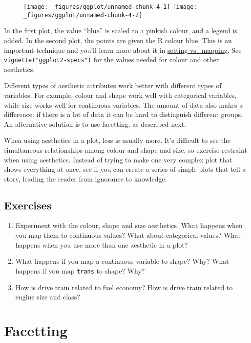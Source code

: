 \begin{figure}[H]
  \texttt{[image: \_figures/ggplot/unnamed-chunk-4-1]}%
  \texttt{[image: \_figures/ggplot/unnamed-chunk-4-2]}
\end{figure}

In the first plot, the value ``blue'' is scaled to a pinkish colour, and
a legend is added. In the second plot, the points are given the R colour
blue. This is an important technique and you'll learn more about it in
\protect\hyperlink{sub:setting-mapping}{setting vs.~mapping}. See
\texttt{vignette("ggplot2-specs")} for the values needed for colour and
other aesthetics.

Different types of aesthetic attributes work better with different types
of variables. For example, colour and shape work well with categorical
variables, while size works well for continuous variables. The amount of
data also makes a difference: if there is a lot of data it can be hard
to distinguish different groups. An alternative solution is to use
facetting, as described next.

When using aesthetics in a plot, less is usually more. It's difficult to
see the simultaneous relationships among colour and shape and size, so
exercise restraint when using aesthetics. Instead of trying to make one
very complex plot that shows everything at once, see if you can create a
series of simple plots that tell a story, leading the reader from
ignorance to knowledge.

\subsection{Exercises}\label{exercises-2}

\begin{enumerate}
\def\labelenumi{\arabic{enumi}.}
\item
  Experiment with the colour, shape and size aesthetics. What happens
  when you map them to continuous values? What about categorical values?
  What happens when you use more than one aesthetic in a plot?
\item
  What happens if you map a continuous variable to shape? Why? What
  happens if you map \texttt{trans} to shape? Why?
\item
  How is drive train related to fuel economy? How is drive train related
  to engine size and class?
\end{enumerate}

\hypertarget{sec:qplot-facetting}{\section{Facetting}\label{sec:qplot-facetting}}

